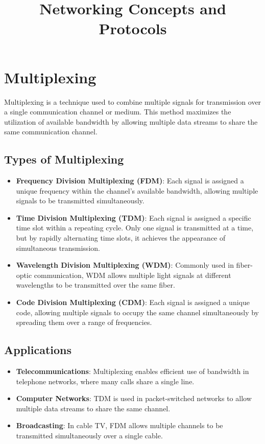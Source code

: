 \documentclass[12pt,a4paper]{article}
\title{Networking Concepts and Protocols}
\author{}
\date{}
\begin{document}
\maketitle

\section{Multiplexing}
Multiplexing is a technique used to combine multiple signals for transmission over a single communication channel or medium. This method maximizes the utilization of available bandwidth by allowing multiple data streams to share the same communication channel.

\subsection{Types of Multiplexing}
\begin{itemize}
    \item \textbf{Frequency Division Multiplexing (FDM)}: Each signal is assigned a unique frequency within the channel's available bandwidth, allowing multiple signals to be transmitted simultaneously.
    \item \textbf{Time Division Multiplexing (TDM)}: Each signal is assigned a specific time slot within a repeating cycle. Only one signal is transmitted at a time, but by rapidly alternating time slots, it achieves the appearance of simultaneous transmission.
    \item \textbf{Wavelength Division Multiplexing (WDM)}: Commonly used in fiber-optic communication, WDM allows multiple light signals at different wavelengths to be transmitted over the same fiber.
    \item \textbf{Code Division Multiplexing (CDM)}: Each signal is assigned a unique code, allowing multiple signals to occupy the same channel simultaneously by spreading them over a range of frequencies.
\end{itemize}

\subsection{Applications}
\begin{itemize}
    \item \textbf{Telecommunications}: Multiplexing enables efficient use of bandwidth in telephone networks, where many calls share a single line.
    \item \textbf{Computer Networks}: TDM is used in packet-switched networks to allow multiple data streams to share the same channel.
    \item \textbf{Broadcasting}: In cable TV, FDM allows multiple channels to be transmitted simultaneously over a single cable.
\end{itemize}
\end{document}
